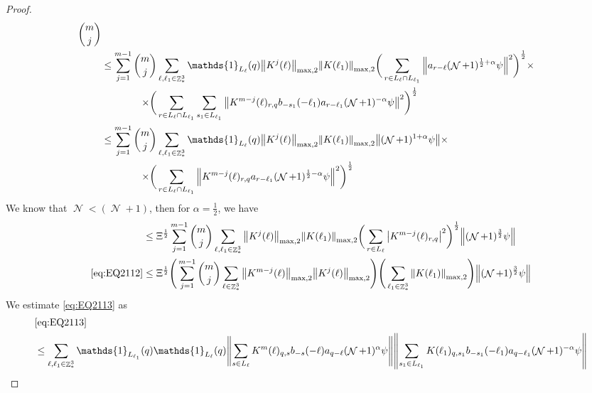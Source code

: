 \documentclass[sn-mathphys, Numbered ,a4paper]{sn-jnl}%
\DeclareMathOperator{\Z}{\mathbb{Z}}
\DeclareMathOperator{\NN}{\mathcal{N}}
\newcommand{\half}{\frac{1}{2}}
\newcommand{\normmaxii}[1]{\norm{#1}_{\mathrm{max,2}}}
\theoremstyle{plain}
\theoremstyle{definition}
\theoremstyle{remark}
\theoremstyle{plain}
\theoremstyle{definition}
\theoremstyle{remark}
\begin{document}
\begin{proof}
\begin{alignat}{2}
\begin{aligned}[t] {{m}\choose j}
    \end{aligned} \nonumber\\   
	&\leq \sum\limits_{j=1}^{m-1} \begin{aligned}[t]{{m}\choose j} &\sum\limits_{\ell,\ell_1 \in \Z^3_*} \mathds{1}_{L_{\ell}}(q) \normmaxii{K^j(\ell)} \normmaxii{K(\ell_1)} 
    \bigg( \sum\limits_{r\in L_{\ell} \cap L_{\ell_1}} \norm{ a_{r-\ell} (\NN+1)^{\half+\alpha}\psi}^2\bigg)^\half \times \nonumber\\ \times 
    \bigg( &\sum\limits_{r\in L_{\ell} \cap L_{\ell_1}} \sum\limits_{s_1 \in L_{\ell_1}}\norm{ K^{m-j}(\ell)_{r,q}  b_{-s_1}(-\ell_1)  a_{r-\ell_1} (\NN+1)^{-\alpha}\psi }^2\bigg)^\half
	\end{aligned} \nonumber\\
	&\leq \sum\limits_{j=1}^{m-1} \begin{aligned}[t]{{m}\choose j} &\sum\limits_{\ell,\ell_1 \in \Z^3_*} \mathds{1}_{L_{\ell}}(q) \normmaxii{K^j(\ell)} \normmaxii{K(\ell_1)}  
	 \norm{ (\NN+1)^{1+\alpha}\psi} \times \nonumber\\ \times 
	\bigg( &\sum\limits_{r\in L_{\ell}\cap L_{\ell_1}}  \norm{ K^{m-j}(\ell)_{r,q} a_{r-\ell_1} (\NN+1)^{\half-\alpha}\psi }^2\bigg)^\half \end{aligned} \nonumber\\
\end{alignat}
We know that $\NN<(\NN+1)$, then for $\alpha = \half$, we have
\begin{alignat}{2}
	&\leq \Xi^\half\sum\limits_{j=1}^{m-1} {{m}\choose j} \sum\limits_{\ell, \ell_1\in \Z^3_*} \normmaxii{K^j(\ell)} \normmaxii{K(\ell_1)} \bigg(\sum\limits_{r\in L_\ell}  \abs{ K^{m-j}(\ell)_{r,q} }^2\bigg)^\half \norm{(\NN+1)^\frac{3}{2} \psi}  \nonumber\\
  	\eqref{eq:EQ2112}&\leq \Xi^\half \Bigg(\sum\limits_{j=1}^{m-1} {{m}\choose j} \sum\limits_{\ell \in \Z^3_*} \norm{K^{m-j}(\ell)}_{ \mathrm{max,2} } \norm{K^{j}(\ell)}_{\mathrm{max,2}}\Bigg) \Bigg(\sum\limits_{ \ell_1\in \Z^3_*} \norm{K(\ell_1)}_{\mathrm{max,2}}\Bigg)  \norm{(\NN+1)^{\frac{3}{2}} \psi} \label{eq:estEQ2112}
  \end{alignat} 
We estimate \eqref{eq:EQ2113} as
\begin{align}
	&\eqref{eq:EQ2113}\nonumber\\
	&\leq\sum\limits_{\ell, \ell_1\in \Z^3_*} \mathds{1}_{L_{\ell_1}}(q) \mathds{1}_{L_{\ell}}(q)  \norm{ \sum\limits_{s\in L_{\ell}} K^m(\ell)_{q,s} b_{-s}(-\ell) a_{q-\ell}(\NN+1)^{\alpha}\psi}\norm{ \sum\limits_{s_1 \in L_{\ell_1}} K(\ell_1)_{q,s_1} b_{-s_1}(-\ell_1)a_{q-\ell_1} (\NN+1)^{-\alpha} \psi }\nonumber\\

\end{align}
\end{proof}
\end{document}
